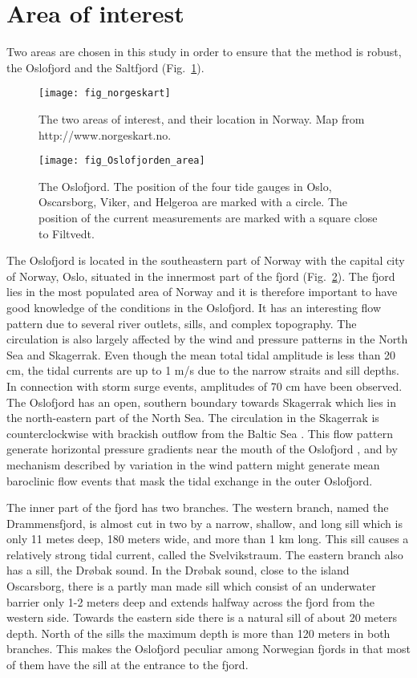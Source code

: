 \section{Area of interest}
Two areas are chosen in this study in order to ensure that the method is robust, the Oslofjord and the Saltfjord (Fig.~\ref{fig:area0}).

\begin{figure}[!t]
\centering
\texttt{[image: fig\_norgeskart]}
\caption{The two areas of interest, and their location in Norway. Map from http://www.norgeskart.no.}
\label{fig:area0}
\end{figure}

\begin{figure}[!t]
\centering
\texttt{[image: fig\_Oslofjorden\_area]}
\caption{The Oslofjord. The position of the four tide gauges in Oslo, Oscarsborg, Viker, and Helgeroa are marked with a circle. The position of the current measurements are marked with a square close to Filtvedt.}
\label{fig:area1}
\end{figure}

The Oslofjord is located in the southeastern part of Norway with the capital city of Norway, Oslo, situated in the innermost part of the fjord (Fig.~\ref{fig:area1}). The fjord lies in the most populated area of Norway and it is therefore important to have good knowledge of the conditions in the Oslofjord. It has an interesting flow pattern due to several river outlets, sills, and complex topography. The circulation is also largely affected by the wind and pressure patterns in the North Sea and Skagerrak. 
Even though the mean total tidal amplitude is less than 20 cm, the tidal currents are up to 1 m/s due to the narrow straits and sill depths. In connection with storm surge events, amplitudes of 70 cm have been observed. The Oslofjord has an open, southern boundary towards Skagerrak which lies in the north-eastern part of the North Sea. The circulation in the Skagerrak is counterclockwise with brackish outflow from the Baltic Sea \cite[]{rodhe96,svendsen96}. This flow pattern generate horizontal pressure gradients near the mouth of the Oslofjord \cite[]{baals90}, and by mechanism described by \cite{klinck81} variation in the wind pattern might generate mean baroclinic flow events that mask the tidal exchange in the outer Oslofjord.

The inner part of the fjord has two branches. The western branch, named the Drammensfjord, is almost cut in two by a narrow, shallow, and long sill which is only 11 metes deep, 180 meters wide, and more than 1 km long. This sill causes a relatively strong tidal current, called the Svelvikstraum. The eastern branch also has a sill, the Dr{\o}bak sound. In the Dr{\o}bak sound, close to the island Oscarsborg, there is a partly man made sill which consist of an underwater barrier only 1-2 meters deep and extends halfway across the fjord from the western side. Towards the eastern side there is a natural sill of about 20 meters depth. North of the sills the maximum depth is more than 120 meters in both branches. This makes the Oslofjord peculiar among Norwegian fjords in that most of them have the sill at the entrance to the fjord.

